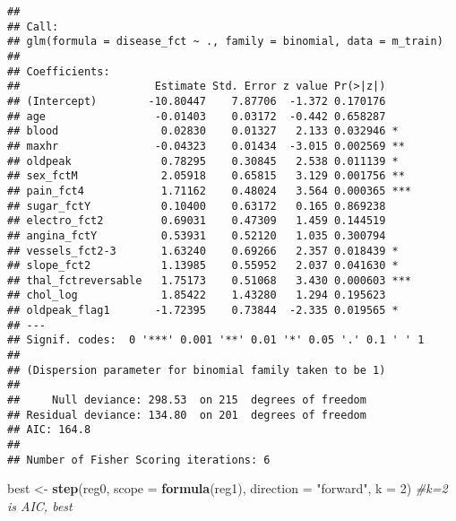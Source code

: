 \documentclass[
]{article}
\newenvironment{Shaded}{\begin{snugshade}}{\end{snugshade}}
\newcommand{\AttributeTok}[1]{\textcolor[rgb]{0.13,0.29,0.53}{#1}}
\newcommand{\CommentTok}[1]{\textcolor[rgb]{0.56,0.35,0.01}{\textit{#1}}}
\newcommand{\DecValTok}[1]{\textcolor[rgb]{0.00,0.00,0.81}{#1}}
\newcommand{\FunctionTok}[1]{\textcolor[rgb]{0.13,0.29,0.53}{\textbf{#1}}}
\newcommand{\NormalTok}[1]{#1}
\newcommand{\OtherTok}[1]{\textcolor[rgb]{0.56,0.35,0.01}{#1}}
\newcommand{\StringTok}[1]{\textcolor[rgb]{0.31,0.60,0.02}{#1}}
\begin{document}
\begin{verbatim}
## 
## Call:
## glm(formula = disease_fct ~ ., family = binomial, data = m_train)
## 
## Coefficients:
##                     Estimate Std. Error z value Pr(>|z|)    
## (Intercept)        -10.80447    7.87706  -1.372 0.170176    
## age                 -0.01403    0.03172  -0.442 0.658287    
## blood                0.02830    0.01327   2.133 0.032946 *  
## maxhr               -0.04323    0.01434  -3.015 0.002569 ** 
## oldpeak              0.78295    0.30845   2.538 0.011139 *  
## sex_fctM             2.05918    0.65815   3.129 0.001756 ** 
## pain_fct4            1.71162    0.48024   3.564 0.000365 ***
## sugar_fctY           0.10400    0.63172   0.165 0.869238    
## electro_fct2         0.69031    0.47309   1.459 0.144519    
## angina_fctY          0.53931    0.52120   1.035 0.300794    
## vessels_fct2-3       1.63240    0.69266   2.357 0.018439 *  
## slope_fct2           1.13985    0.55952   2.037 0.041630 *  
## thal_fctreversable   1.75173    0.51068   3.430 0.000603 ***
## chol_log             1.85422    1.43280   1.294 0.195623    
## oldpeak_flag1       -1.72395    0.73844  -2.335 0.019565 *  
## ---
## Signif. codes:  0 '***' 0.001 '**' 0.01 '*' 0.05 '.' 0.1 ' ' 1
## 
## (Dispersion parameter for binomial family taken to be 1)
## 
##     Null deviance: 298.53  on 215  degrees of freedom
## Residual deviance: 134.80  on 201  degrees of freedom
## AIC: 164.8
## 
## Number of Fisher Scoring iterations: 6
\end{verbatim}

\begin{Shaded}
\begin{Highlighting}[]
\NormalTok{best }\OtherTok{\textless{}{-}} \FunctionTok{step}\NormalTok{(reg0, }\AttributeTok{scope =} \FunctionTok{formula}\NormalTok{(reg1), }
             \AttributeTok{direction =} \StringTok{"forward"}\NormalTok{, }\AttributeTok{k =} \DecValTok{2}\NormalTok{) }\CommentTok{\#k=2 is AIC, best}
\end{Highlighting}
\end{Shaded}
\end{document}
